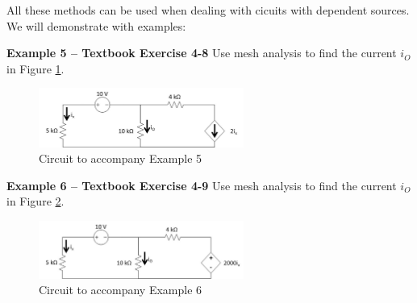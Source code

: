\documentclass{handout}
\begin{document}
All these methods can be used when dealing with cicuits with dependent sources.  We will demonstrate with examples:


\textbf{Example 5 -- Textbook Exercise 4-8}
Use mesh analysis to find the current $i_O$ in Figure \ref{fig: Example5}.
\begin{figure}[h! t! b!]
\centering
\includegraphics[width=0.6\textwidth]{Example5.jpg}
\caption{Circuit to accompany Example 5}
\label{fig: Example5}
\end{figure}



\textbf{Example 6 -- Textbook Exercise 4-9}
Use mesh analysis to find the current $i_O$ in Figure \ref{fig: Example6}.
\begin{figure}[h! t! b!]
\centering
\includegraphics[width=0.6\textwidth]{Example6.jpg}
\caption{Circuit to accompany Example 6}
\label{fig: Example6}
\end{figure}
\end{document}
